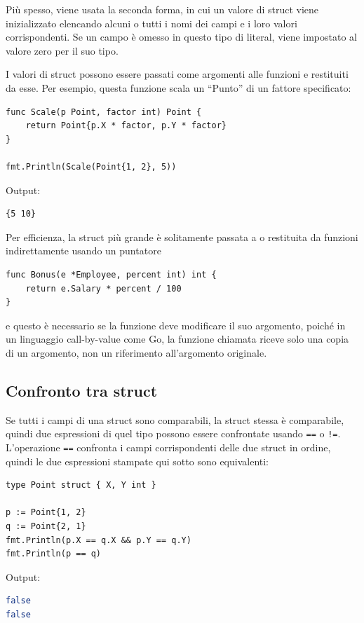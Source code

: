 Più spesso, viene usata la seconda forma, in cui un valore di struct viene inizializzato elencando alcuni o tutti i nomi dei campi e i loro valori corrispondenti.
Se un campo è omesso in questo tipo di literal, viene impostato al valore zero per il suo tipo.

I valori di struct possono essere passati come argomenti alle funzioni e restituiti da esse.
Per esempio, questa funzione scala un ``Punto'' di un fattore specificato:
\begin{lstlisting}[frame=single, label={lst:lstlisting3-4-1.2}]
func Scale(p Point, factor int) Point {
    return Point{p.X * factor, p.Y * factor}
}

fmt.Println(Scale(Point{1, 2}, 5))
\end{lstlisting}
Output:
\begin{lstlisting}[language=bash, frame=L, label={lst:lstlisting3-4-1.3}]
{5 10}
\end{lstlisting}
Per efficienza, la struct più grande è solitamente passata a o restituita da funzioni indirettamente usando un puntatore
\begin{lstlisting}[frame=single, label={lst:lstlisting3-4-1.4}]
func Bonus(e *Employee, percent int) int {
    return e.Salary * percent / 100
}
\end{lstlisting}
e questo è necessario se la funzione deve modificare il suo argomento, poiché in un linguaggio call-by-value come Go, la funzione chiamata riceve solo una copia di un argomento, non un riferimento all'argomento originale.

\subsection{Confronto tra struct}
\label{subsec:confronto_tra_struct}%
Se tutti i campi di una struct sono comparabili, la struct stessa è comparabile, quindi due espressioni di quel tipo possono essere confrontate usando \verb|==| o \verb|!=|.
L'operazione \verb|==| confronta i campi corrispondenti delle due struct in ordine, quindi le due espressioni stampate qui sotto sono equivalenti:
\begin{lstlisting}[frame=single, label={lst:lstlisting3-4-2.1}]
type Point struct { X, Y int }

p := Point{1, 2}
q := Point{2, 1}
fmt.Println(p.X == q.X && p.Y == q.Y)
fmt.Println(p == q)
\end{lstlisting}
Output:
\begin{lstlisting}[language=bash, frame=L, label={lst:lstlisting3-4-2.2}]
false
false
\end{lstlisting}


